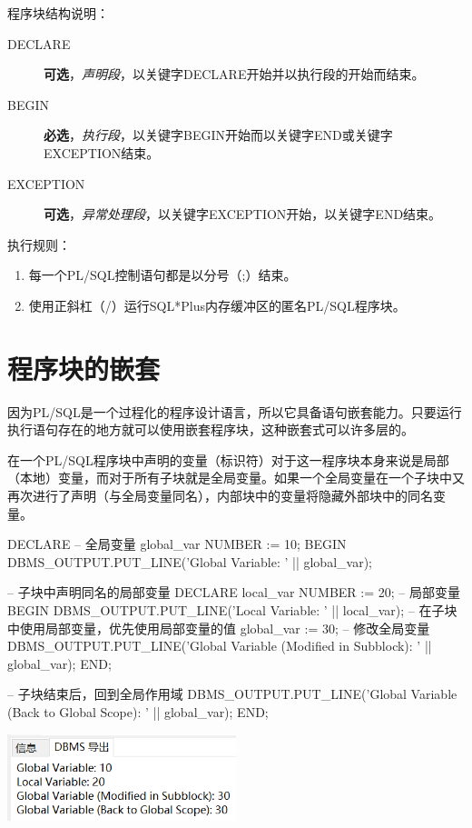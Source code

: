 \documentclass[11pt, a4paper, oneside, UTF8]{ctexbook}
\let\kaishu\relax %
\begin{document}
程序块结构说明：
\begin{description}
  \item[DECLARE] {\bfseries\kaishu 可选}，\textit{声明段}，以关键字DECLARE开始并以执行段的开始而结束。
  \item[BEGIN] {\bfseries\kaishu 必选}，\textit{执行段}，以关键字BEGIN开始而以关键字END或关键字EXCEPTION结束。
  \item[EXCEPTION] {\bfseries\kaishu 可选}，\textit{异常处理段}，以关键字EXCEPTION开始，以关键字END结束。
\end{description}
执行规则：
\begin{enumerate}
  \item 每一个PL/SQL控制语句都是以分号（;）结束。
  \item 使用正斜杠（/）运行SQL*Plus内存缓冲区的匿名PL/SQL程序块。
\end{enumerate}

\section{程序块的嵌套}
因为PL/SQL是一个过程化的程序设计语言，所以它具备语句嵌套能力。只要运行执行语句存在的地方就可以使用嵌套程序块，这种嵌套式可以许多层的。

在一个PL/SQL程序块中声明的变量（标识符）对于这一程序块本身来说是局部（本地）变量，而对于所有子块就是全局变量。如果一个全局变量在一个子块中又再次进行了声明（与全局变量同名），内部块中的变量将隐藏外部块中的同名变量。

\begin{plsql}[caption=程序块嵌套示例代码]
DECLARE
  -- 全局变量
  global_var NUMBER := 10;
BEGIN
  DBMS_OUTPUT.PUT_LINE('Global Variable: ' || global_var);
 
  -- 子块中声明同名的局部变量
  DECLARE
    local_var NUMBER := 20; -- 局部变量
  BEGIN
    DBMS_OUTPUT.PUT_LINE('Local Variable: ' || local_var);
    -- 在子块中使用局部变量，优先使用局部变量的值
    global_var := 30; -- 修改全局变量
    DBMS_OUTPUT.PUT_LINE('Global Variable (Modified in Subblock): ' || global_var);
  END;
 
  -- 子块结束后，回到全局作用域
  DBMS_OUTPUT.PUT_LINE('Global Variable (Back to Global Scope): ' || global_var);
END;
\end{plsql}

\begin{center}
  \begin{minipage}{\textwidth}
    \center
    \includegraphics[width=0.5\textwidth]{picture/嵌套程序块示例代码运行结果.png}
    \captionsetup{hypcap=false}
    \label{fig:嵌套程序块示例代码运行结果}
  \end{minipage}
\end{center}
\end{document}
